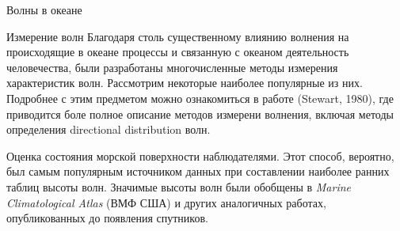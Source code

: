 \begin{chapter}{Волны в океане}
\begin{section}{Измерение волн}
Благодаря столь существенному влиянию
волнения на происходящие в океане процессы и связанную с океаном деятельность
человечества, были разработаны многочисленные методы измерения характеристик
волн. Рассмотрим некоторые наиболее популярные из них. Подробнее с этим
предметом можно ознакомиться в работе (Stewart, 1980), где приводится
боле полное описание методов измерени волнения, включая методы определения
directional distribution волн.
%

\begin{paragraph}{Оценка состояния морской поверхности наблюдателями.} 
Этот способ, вероятно, был самым популярным источником данных
при составлении наиболее ранних таблиц высоты волн. Значимые высоты
волн были обобщены в \emph{Marine Climatological Atlas} (ВМФ США)
и других аналогичных работах, опубликованных до появления спутников.
%
\end{paragraph}


\end{section}
\end{chapter}
